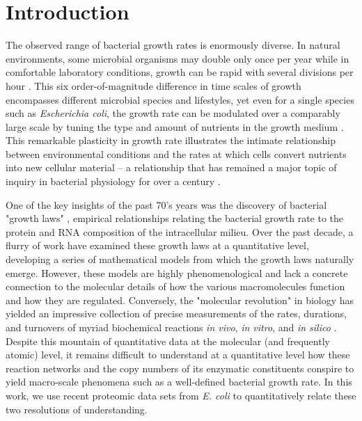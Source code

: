 \section{Introduction}
The observed range of bacterial growth rates is enormously diverse. In
natural environments, some microbial organisms may double only once per
year \citep{mikucki2009} while in comfortable laboratory conditions, growth
can be rapid with several divisions per hour \citep{schaechter1958}. This six
order-of-magnitude difference in time scales of growth encompasses different microbial
species and lifestyles, yet even for a single species such as \textit{Escherichia
coli}, the growth rate can be modulated over a comparably large scale by tuning the
type and amount of nutrients in the growth medium \citep{liu2005a}. This remarkable
plasticity in growth rate illustrates the intimate relationship between
environmental conditions and the rates at which cells convert nutrients into
new cellular material -- a relationship that has remained a major topic of
inquiry in bacterial physiology for over a century \citep{jun2018}.


One of the key insights of the past 70's years was the discovery of bacterial "growth laws" \citep{schaechter1958}, 
empirical relationships relating the bacterial growth rate to the protein and RNA composition 
of the intracellular milieu. Over the past decade, a flurry of work \citep{molenaar2009, scott2010,
klumpp2014, basan2015, dai2016, erickson2017} have examined these growth laws at
a quantitative level, developing a series of mathematical models from which 
the growth laws naturally emerge. However, these models are highly phenomenological and 
lack a concrete connection to the molecular details of how the various macromolecules function 
and how they are regulated. Conversely, the "molecular revolution" in biology has 
yielded an impressive collection of precise measurements of the rates, durations, and 
turnovers of myriad biochemical reactions \textit{in vivo}, \textit{in vitro}, and \textit{in silico} \citep{davidi2016a}. 
Despite this mountain of quantitative data at the molecular (and frequently atomic) level,
it remains difficult to understand at a quantitative level how these reaction networks and the 
copy numbers of its enzymatic constituents conspire to yield macro-scale phenomena such as a well-defined
bacterial growth rate. In this work, we use recent proteomic data sets 
from \textit{E. coli} to quantitatively relate these two resolutions of understanding.


